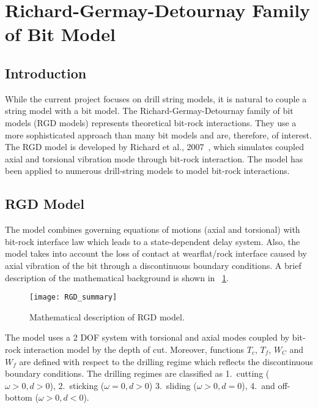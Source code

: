\section{Richard-Germay-Detournay Family of Bit Model}
\label{ch:rgdmodels}

\subsection{Introduction}
While the current project focuses on drill string models, it is natural to couple a string model with a bit model. The Richard-Germay-Detournay family of bit models (RGD models) represents theoretical bit-rock interactions. They use a more sophisticated approach than many bit models and are, therefore, of interest. The RGD model is developed by Richard et al., 2007\ \cite{ref:richard2007a}, which simulates coupled axial and torsional vibration mode through bit-rock interaction. The model has been applied to numerous drill-string models to model bit-rock interactions.

\subsection{RGD Model}
The model combines governing equations of motions (axial and torsional) with bit-rock interface law which leads to a state-dependent delay system. Also, the model takes into account the loss of contact at wearflat/rock interface caused by axial vibration of the bit through a discontinuous boundary conditions. A brief description of the mathematical background is shown in \figurename~\ref{figure_RGD_Summary}.
\begin{figure}
  \centering
  \texttt{[image: RGD\_summary]}
  \caption[Mathematical description of RGD model]{Mathematical description of RGD model.}\label{figure_RGD_Summary}
\end{figure}
The model uses a 2 DOF system with torsional and axial modes coupled by bit-rock interaction model by the depth of cut. \needsclarification{} Moreover, functions $T_c$, $T_f$, $W_C$ and $W_f$  are defined with respect to the drilling regime which reflects the discontinuous boundary conditions. \needsclarification{} The drilling regimes are classified as 1.\ cutting ($\omega>0, d>0$), 2.\ sticking ($\omega=0, d>0$) 3.\ sliding ($\omega>0, d=0$), 4.\ and off-bottom ($\omega>0, d<0$). 


